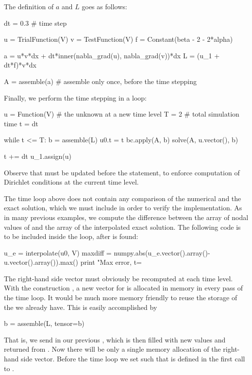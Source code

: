 The definition of $a$ and $L$ goes as follows:
\begin{python}
dt = 0.3      # time step

u = TrialFunction(V)
v = TestFunction(V)
f = Constant(beta - 2 - 2*alpha)

a = u*v*dx + dt*inner(nabla_grad(u), nabla_grad(v))*dx
L = (u_1 + dt*f)*v*dx

A = assemble(a)   # assemble only once, before the time stepping
\end{python}

\clearpage

Finally, we perform the time stepping in a loop:
\begin{python}
u = Function(V)   # the unknown at a new time level
T = 2             # total simulation time
t = dt

while t <= T:
    b = assemble(L)
    u0.t = t
    bc.apply(A, b)
    solve(A, u.vector(), b)

    t += dt
    u_1.assign(u)
\end{python}
Observe that  must be updated before the 
statement, to
enforce computation of Dirichlet conditions at the current time level.

The time loop above does not contain any comparison of the numerical
and the exact solution, which we must include in order to verify the
implementation.  As in many previous examples, we compute the
difference between the array of nodal values of  and the array
of the interpolated exact solution.  The following code is to be
included inside the loop, after  is found:
\begin{python}
u_e = interpolate(u0, V)
maxdiff = numpy.abs(u_e.vector().array()-u.vector().array()).max()
print "Max error, t=%
\end{python}

The right-hand side vector  must obviously be recomputed at
each time level.  With the construction , a new
vector for  is allocated in memory in every pass of the time
loop.  It would be much more memory friendly to reuse the storage of
the  we already have. This is easily accomplished
by
\begin{python}
b = assemble(L, tensor=b)
\end{python}
That is, we send in our previous , which is then filled with new
values and returned from . Now there will be only a single
memory allocation of the right-hand side vector. Before the time loop
we set  such that  is defined in the first call
to .

